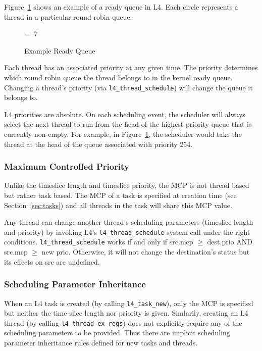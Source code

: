 Figure~\ref{fig:pbl} shows an example of a ready queue in L4. Each circle 
represents a thread in a particular round robin queue. 

\begin{figure}[htb]
\begin{center}
\leavevmode
\epsfxsize = .7\textwidth
{}
\end{center}
\caption{Example Ready Queue}
\label{fig:pbl}
\end{figure}

Each thread has an associated priority at any given time. The priority
determines which round robin queue the thread belongs to in the kernel
ready queue.  Changing a thread's priority (via
{\footnotesize\verb+l4_thread_schedule+}) will change the queue it belongs to.

L4 priorities are absolute.  On each scheduling event, the scheduler
will always select the next thread to run from the head of the highest
priority queue that is currently non-empty. For example, in
Figure~\ref{fig:pbl}, the scheduler would take the thread at the head
of the queue associated with priority 254.

\subsubsection{Maximum Controlled Priority}
\label{sec:mcp}

Unlike the timeslice length and timeslice priority, the MCP is not
thread based but rather task based. The MCP of a task is specified at
creation time (see Section~\ref{sec:tasks}) and all threads in the
task will share this MCP value.

Any thread can change another thread's scheduling parameters (timeslice
length and priority) by invoking L4's {\footnotesize\verb+l4_thread_schedule+} system
call under the right conditions. {\footnotesize\verb+l4_thread_schedule+} works if
and only if src.mcp $\geq$ dest.prio AND src.mcp $\geq$ new prio.
Otherwise, it will not change the destination's status but its effects
on src are undefined.

\subsubsection{Scheduling Parameter Inheritance}

When an L4 task is created (by calling {\footnotesize\verb+l4_task_new+}), only the
MCP is specified but neither the time slice length nor priority is
given. Simlarily, creating an L4 thread (by calling
{\footnotesize\verb+l4_thread_ex_regs+}) does not explicitly require any of the
scheduling parameters to be provided. Thus there are implicit
scheduling parameter inheritance rules defined for new tasks and
threads.

